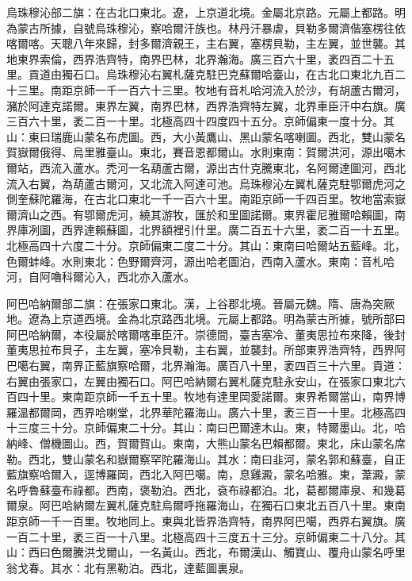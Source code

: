 \begin{pinyinscope}
烏珠穆沁部二旗：在古北口東北。遼，上京道北境。金屬北京路。元屬上都路。明為蒙古所據，自號烏珠穆沁，察哈爾汗族也。林丹汗暴虐，貝勒多爾濟偕塞楞往依喀爾喀。天聰八年來歸，封多爾濟親王，主右翼，塞楞貝勒，主左翼，並世襲。其地東界索倫，西界浩齊特，南界巴林，北界瀚海。廣三百六十里，袤四百二十五里。貢道由獨石口。烏珠穆沁右翼札薩克駐巴克蘇爾哈臺山，在古北口東北九百二十三里。南距京師一千一百六十三里。牧地有音札哈河流入於沙，有胡蘆古爾河，瀦於阿達克諾爾。東界左翼，南界巴林，西界浩齊特左翼，北界車臣汗中右旗。廣三百六十里，袤二百一十里。北極高四十四度四十五分。京師偏東一度十分。其山：東曰瑞鹿山蒙名布虎圖。西，大小黃鷹山、黑山蒙名喀喇圖。西北，雙山蒙名賀嶽爾俄得、烏里雅臺山。東北，賽音恩都爾山。水則東南：賀爾洪河，源出噶木爾站，西流入蘆水。禿河一名葫蘆古爾，源出古什克騰東北，名阿爾達圖河，西北流入右翼，為葫蘆古爾河，又北流入阿達可池。烏珠穆沁左翼札薩克駐鄂爾虎河之側奎蘇陀羅海，在古北口東北一千一百六十里。南距京師一千四百里。牧地當索嶽爾濟山之西。有鄂爾虎河，繞其游牧，匯於和里圖諾爾。東界霍尼雅爾哈賴圖，南界庫冽圖，西界達賴蘇圖，北界額裡引什里。廣二百五十六里，袤二百一十五里。北極高四十六度二十分。京師偏東二度二十分。其山：東南曰哈爾站五藍峰。北，色爾蚌峰。水則東北：色野爾齊河，源出哈老圖泊，西南入蘆水。東南：音札哈河，自阿嚕科爾沁入，西北亦入蘆水。

阿巴哈納爾部二旗：在張家口東北。漢，上谷郡北境。晉屬元魏。隋、唐為突厥地。遼為上京道西境。金為北京路西北境。元屬上都路。明為蒙古所據，號所部曰阿巴哈納爾，本役屬於喀爾喀車臣汗。崇德間，臺吉塞冷、董夷思拉布來降，後封董夷思拉布貝子，主左翼，塞冷貝勒，主右翼，並襲封。所部東界浩齊特，西界阿巴噶右翼，南界正藍旗察哈爾，北界瀚海。廣百八十里，袤四百三十六里。貢道：右翼由張家口，左翼由獨石口。阿巴哈納爾右翼札薩克駐永安山，在張家口東北六百四十里。東南距京師一千五十里。牧地有達里岡愛諾爾。東界希爾當山，南界博羅溫都爾岡，西界哈喇堂，北界華陀羅海山。廣六十里，袤三百一十里。北極高四十三度三十分。京師偏東二十分。其山：南曰巴爾達木山。東，特爾墨山。北，哈納峰、僧機圖山。西，賀爾賀山。東南，大熊山蒙名巴賴都爾。東北，床山蒙名席勒。西北，雙山蒙名和嶽爾察罕陀羅海山。其水：南曰韭河，蒙名郭和蘇臺，自正藍旗察哈爾入，逕博羅岡，西北入阿巴噶。南，息雞澱，蒙名哈雅。東，葦澱，蒙名呼魯蘇臺布祿都。西南，褒勒泊。西北，袞布祿都泊。北，葛都爾庫泉、和幾葛爾泉。阿巴哈納爾左翼札薩克駐烏爾呼拖羅海山，在獨石口東北五百八十里。東南距京師一千一百里。牧地同上。東與北皆界浩齊特，南界阿巴噶，西界右翼旗。廣一百二十里，袤三百一十八里。北極高四十三度五十三分。京師偏東二十八分。其山：西曰色爾騰洪戈爾山，一名黃山。西北，布爾漢山、觸寶山、覆舟山蒙名呼里翁戈春。其水：北有黑勒泊。西北，達藍圖裏泉。


\end{pinyinscope}
